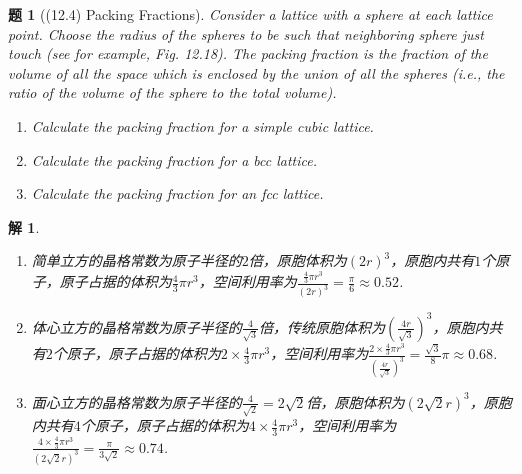 \documentclass[UTF8,10pt,a4paper]{article}
\theoremstyle{Problem}
\newtheorem{prob}{题}
\theoremstyle{Solution}
\newtheorem*{sol}{解}
\begin{document}
\begin{prob}[(12.4) Packing Fractions]
    Consider a lattice with a sphere at each lattice point. Choose the radius of the spheres to be such that neighboring sphere just touch (see for example, Fig. 12.18). The packing fraction is the fraction of the volume of all the space which is enclosed by the union of all the spheres (i.e., the ratio of the volume of the sphere to the total volume).
    \begin{enumerate}
        \item[(a)] Calculate the packing fraction for a simple cubic lattice.
        \item[(b)] Calculate the packing fraction for a bcc lattice.
        \item[(c)] Calculate the packing fraction for an fcc lattice.
    \end{enumerate}
\end{prob}
\begin{sol}
    \begin{enumerate}
        \item[(a)] 简单立方的晶格常数为原子半径的$2$倍，原胞体积为$(2r)^3$，原胞内共有$1$个原子，原子占据的体积为$\frac{4}{3}\pi r^3$，空间利用率为$\frac{\frac{4}{3}\pi r^3}{(2r)^3}=\frac{\pi}{6}\approx 0.52$.
        \item[(b)] 体心立方的晶格常数为原子半径的$\frac{4}{\sqrt{3}}$倍，传统原胞体积为$\left(\frac{4r}{\sqrt{3}}\right)^3$，原胞内共有$2$个原子，原子占据的体积为$2\times\frac{4}{3}\pi r^3$，空间利用率为$\frac{2\times\frac{4}{3}\pi r^3}{\left(\frac{4r}{\sqrt{3}}\right)^3}=\frac{\sqrt{3}}{8}\pi\approx 0.68$.
        \item[(c)] 面心立方的晶格常数为原子半径的$\frac{4}{\sqrt{2}}=2\sqrt{2}$倍，原胞体积为$(2\sqrt{2}r)^3$，原胞内共有$4$个原子，原子占据的体积为$4\times\frac{4}{3}\pi r^3$，空间利用率为$\frac{4\times\frac{4}{3}\pi r^3}{(2\sqrt{2}r)^3}=\frac{\pi}{3\sqrt{2}}\approx 0.74$.
    \end{enumerate}
\end{sol}
\end{document}

